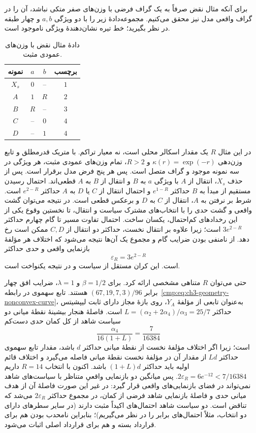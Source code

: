 برای آنکه مثال نقض صرفاً به یک گراف فرضی با وزن‌های صفر متکی نباشد، آن را در گراف واقعی مدل نیز محقق می‌کنیم. مجموعه‌دادهٔ زیر را با دو ویژگی $a,b$ و چهار طبقه در نظر بگیرید؛ خط تیره نشان‌دهندهٔ ویژگی ناموجود است.
\begin{table}[!htbp]
\centering
\caption{دادهٔ مثال نقض با وزن‌های عمودی مثبت.}
\label{cmp:tab:ch3-geometry-nonconvex-data}
\begin{tabular}{c|ccc}
\hline
نمونه & $a$ & $b$ & برچسب\\\hline
$X_s$ & $0$ & -- & $1$\\
$A$ & $1$ & $R$ & $2$\\
$B$ & $R$ & -- & $3$\\
$C$ & -- & $0$ & $4$\\
$D$ & -- & $1$ & $4$\\\hline
\end{tabular}
\end{table}
در این مثال $R$ یک مقدار اسکالر محلی است، نه معیار تراکم. با متریک قدرمطلق و تابع وزن‌دهی $\kappa(r)=\exp(-r)$ و $R>2$، تمام وزن‌های عمودی مثبت، هر ویژگی در سه نمونه موجود و گراف متصل است. پس هر پنج فرض مدل برقرار است. پس از حذف $X_s$، انتقال از $A$ با ویژگی $a$ به $B$ و انتقال از $B$ به $A$ قطعی‌اند. احتمال رسیدن مستقیم از مبدأ به $B$ حداکثر $e^{1-R}$ و احتمال انتقال از $C$ یا $D$ به $A$ حداکثر $e^{2-R}$ است. شرط بر نرفتن به $A$، انتقال از $C$ به $D$ و برعکس قطعی است. در نتیجه می‌توان گشت واقعی و گشت حدی را با انتخاب‌های مشترک سیاست و انتقال، تا نخستین وقوع یکی از این رخدادهای کم‌احتمال، یکسان ساخت. احتمال تفاوت مسیر تا گام چهارم حداکثر $3e^{2-R}$ است؛ زیرا علاوه بر انتقال نخست، حداکثر دو انتقال از $C,D$ ممکن است رخ دهد. از نامنفی بودن ضرایب گام و مجموع یک آن‌ها نتیجه می‌شود که اختلاف هر مؤلفهٔ بازنمایی واقعی و حدی حداکثر
\[
\varepsilon_R=3e^{2-R}
\]
است. این کران مستقل از سیاست و در نتیجه یکنواخت است.

حتی می‌توان $R$ متناهی مشخصی ارائه کرد. برای $\beta=1/2$ و $\lambda=1$، ضرایب افق چهار برابر $(67,19,7,3)/96$ هستند. تابع سهموی در رابطه~\eqref{cmp:eq:ch3-geometry-nonconvex-curve}، به‌عنوان تابعی از مؤلفهٔ $Y_A$، روی بازهٔ مجاز دارای ثابت لیپشیتس حداکثر $L=(\alpha_2+2\alpha_4)/\alpha_3=25/7$ است. فاصلهٔ هنجار بیشینهٔ نقطهٔ میانی دو سیاست شاهد از کل کمان حدی دست‌کم
\[
\frac{\alpha_4}{16(1+L)}=\frac{7}{16384}
\]
است؛ زیرا اگر اختلاف مؤلفهٔ نخست از نقطهٔ میانی حداکثر $d$ باشد، مقدار تابع سهموی حداکثر $Ld$ از مقدار آن در مؤلفهٔ نخست نقطهٔ میانی فاصله می‌گیرد و اختلاف قائم اولیه باید حداکثر $(1+L)d$ باشد. اکنون با انتخاب $R=14$ داریم $2\varepsilon_R=6e^{-12}<7/16384$. پس میانگین دو بازنمایی واقعیِ متناظر با سیاست‌های شاهد نمی‌تواند در فضای بازنمایی‌های واقعی قرار گیرد: در غیر این صورت فاصلهٔ آن از هدف میانی حدی و فاصلهٔ بازنمایی شاهد فرضی از کمان، در مجموع حداکثر $2\varepsilon_R$ می‌شد که تناقض است. دو سیاست شاهد احتمال‌های اکیداً مثبت دارند (در سایر سطرهای دارای دو انتخاب، مثلاً احتمال‌های برابر را در نظر می‌گیریم)؛ بنابراین نامحدب بودن هم برای قرارداد بسته و هم برای قرارداد اصلی اثبات می‌شود.

